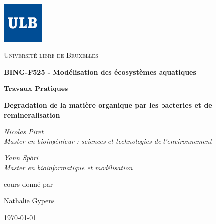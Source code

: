 \documentclass[12pt,a4paper]{article}
\begin{document}
{
\raggedleft
\includegraphics[width=0.15\textwidth]{ulbnorm.jpg}
\par\vspace{-1.8cm}
\centering
{\scshape\LARGE Université libre de Bruxelles \par}
\vspace{2.4cm}
{\Huge\bfseries BING-F525 - Modélisation des écosystèmes aquatiques\par}
\vspace{1.2cm}
{\Large\bfseries Travaux Pratiques\par}
\vspace{1.0cm}
{\LARGE\bfseries Degradation de la matière organique par les bacteries et de remineralisation\par}
\vspace{1.5cm}
{\Large\itshape Nicolas Piret\\Master en bioingénieur : sciences et technologies de l'environnement\par}
\vspace{0.5cm}
{\Large\itshape Yann Spöri\\Master en bioinformatique et modélisation\par}
\vfill
cours donné par\par
Nathalie Gypens%
\vfill
\begin{center}{\large \today}\end{center}
}
\newpage
{}

\tableofcontents
\newpage


\FloatBarrier

\FloatBarrier

\FloatBarrier
%
\end{document}
